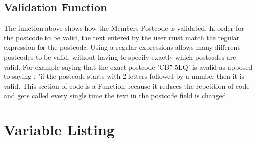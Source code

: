 \subsection{Validation Function}
\begin{figure}[H]
\end{figure}

The function above shows how the Members Postcode is validated. In order for the postcode to be valid, the text entered by the user must match the regular expression for the postcode. Using a regular expressions allows many different postcodes to be valid, without having to specify exactly which postcodes are valid. For example saying that the exact postcode 'CB7 5LQ' is avalid as apposed to saying : "if the postcode starts with 2 letters followed by a number then it is valid. This section of code is a Function because it reduces the repetition of code and gets called every single time the text in the postcode field is changed. 

\pagebreak

\section{Variable Listing}

